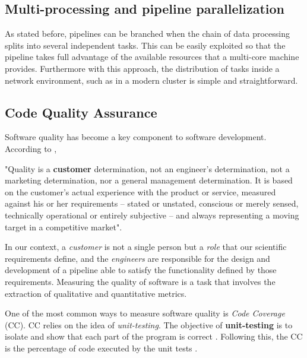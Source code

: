 \documentclass[final,5p,times,twocolumn,authoryear]{elsarticle}
\begin{document}

\subsection{Multi-processing and pipeline parallelization}

As stated before, pipelines can be branched when the chain of data processing
splits into several independent tasks.
%
This can be easily exploited so that the pipeline takes full advantage of the available
resources that a multi-core machine provides.
%
Furthermore with this approach, the distribution of tasks inside a network environment,
such as in a modern cluster is simple and straightforward.
%
\subsection{Code Quality Assurance}
\label{qa}


Software quality has become a key component to software development.
%
According to \citet{feigenbaum1983total},
%
\begin{displayquote}
"Quality is a \textbf{customer} determination, not an engineer's determination,
not a marketing determination, nor a general management determination.
It is based on the customer's actual experience with the product or service,
measured against his or her requirements --
stated or unstated, conscious or merely sensed,
technically operational or entirely subjective --
and always representing a moving target in a competitive market".
\end{displayquote}

In our context, a \textit{customer} is not a single person but a
\textit{role} that our scientific requirements define, and the \textit{engineers}
are responsible for the design and development of a pipeline able
to satisfy the functionality defined by those requirements.
%
Measuring the quality of software is a task that involves the
extraction of qualitative and quantitative metrics.

One of the most common ways to measure software quality
is \textit{Code Coverage} (CC).
%
%
CC relies on the idea of \textit{unit-testing}.
%
The objective of \textbf{unit-testing} is to isolate and show that each part of the program is correct \citep{jazayeri_trends_2007}.
Following this, the CC is the percentage of code executed by the unit tests \citep{miller1963systematic}.
\end{document}
